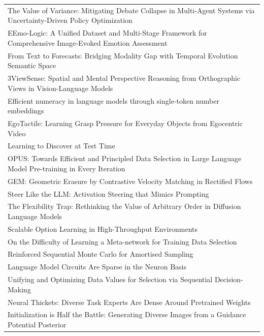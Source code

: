 \begin{table}[!ht]
{\begin{tabular}{l}
The Value of Variance: Mitigating Debate Collapse in Multi-Agent Systems via Uncertainty-Driven Policy Optimization \citep{tang2026the}\\
EEmo-Logic: A Unified Dataset and Multi-Stage Framework for Comprehensive Image-Evoked Emotion Assessment \citep{gao2026eemologic}\\
From Text to Forecasts: Bridging Modality Gap with Temporal Evolution Semantic Space \citep{li2026from}\\
3ViewSense: Spatial and Mental Perspective Reasoning from Orthographic Views in Vision-Language Models \citep{zhan2026viewsense}\\
Efficient numeracy in language models through single-token number embeddings \citep{kreitner2026efficient}\\
EgoTactile: Learning Grasp Pressure for Everyday Objects from Egocentric Video \citep{zeng2026egotactile}\\
Learning to Discover at Test Time \citep{yuksekgonul2026learning}\\
OPUS: Towards Efficient and Principled Data Selection in Large Language Model Pre-training in Every Iteration \citep{wang2026opus}\\
GEM: Geometric Erasure by Contrastive Velocity Matching in Rectified Flows \citep{grebe2026gem}\\
Steer Like the LLM: Activation Steering that Mimics Prompting \citep{heyman2026steer}\\
The Flexibility Trap: Rethinking the Value of Arbitrary Order in Diffusion Language Models \citep{ni2026the}\\
Scalable Option Learning in High-Throughput Environments \citep{henaff2026scalable}\\
On the Difficulty of Learning a Meta-network for Training Data Selection \citep{du2026on}\\
Reinforced Sequential Monte Carlo for Amortised Sampling \citep{choi2026reinforced}\\
Language Model Circuits Are Sparse in the Neuron Basis \citep{arora2026language}\\
Unifying and Optimizing Data Values for Selection via Sequential Decision-Making \citep{chi2026unifying}\\
Neural Thickets: Diverse Task Experts Are Dense Around Pretrained Weights \citep{gan2026neural}\\
Initialization is Half the Battle: Generating Diverse Images from a Guidance Potential Posterior \citep{li2026initialization}\\

\end{tabular}}
\end{table}
